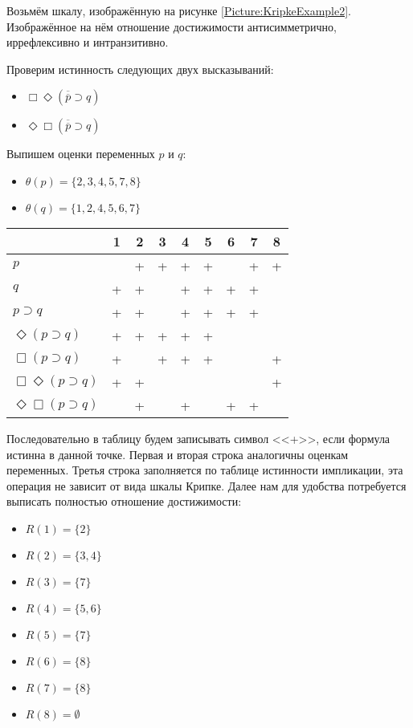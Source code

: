 \begin{example}
    Возьмём шкалу, изображённую на рисунке \ref{Picture:KripkeExample2}.  Изображённое на нём отношение достижимости антисимметрично, иррефлексивно и интранзитивно.

    Проверим истинность следующих двух высказываний:
    \begin{itemize}
        \item $\Box \Diamond (\overline{\overline{p}} \supset q)$
        \item $\Diamond \Box (\overline{\overline{p}} \supset q)$
    \end{itemize}

    Выпишем оценки переменных $p$ и $q$:
    \begin{itemize}
        \item $\theta(p) = \{2, 3, 4, 5, 7, 8 \}$
        \item $\theta(q) = \{1, 2, 4, 5, 6, 7 \}$
    \end{itemize}

    \begin{center}
        \begin{tabular}{|l|c|c|c|c|c|c|c|c|}\hline
            & 1 & 2 & 3 & 4 & 5 & 6 & 7 & 8 \\ \hline
            $p$ & & + & + & + & + & & + & +  \\ \hline
            $q$ & + & + & & + & + & + & + &  \\ \hline
            $p \supset q$ & + & + & & + & + & + & + &  \\ \hline
            $\Diamond (p \supset q)$ & + & + & + & + & + & & &  \\ \hline
            $\Box (p \supset q)$ & + & & + & + & + & & & +  \\ \hline
            $\Box \Diamond (p \supset q)$ & + & + & & & & & & +  \\ \hline
            $\Diamond \Box (p \supset q)$ & & + & & + & & + & + &  \\ \hline
        \end{tabular}
    \end{center}

    Последовательно в таблицу будем записывать символ <<+>>, если формула истинна в данной точке. Первая и вторая строка аналогичны оценкам переменных. Третья строка заполняется по таблице истинности импликации, эта операция не зависит от вида шкалы Крипке. Далее нам для удобства потребуется выписать полностью отношение достижимости:

    \begin{itemize}
        \item $R(1)=\{2\}$
        \item $R(2)=\{3,4\}$
        \item $R(3)=\{7\}$
        \item $R(4)=\{5,6\}$
        \item $R(5)=\{7\}$
        \item $R(6)=\{8\}$
        \item $R(7)=\{8\}$
        \item $R(8)=\emptyset$
    \end{itemize}


\end{example}
